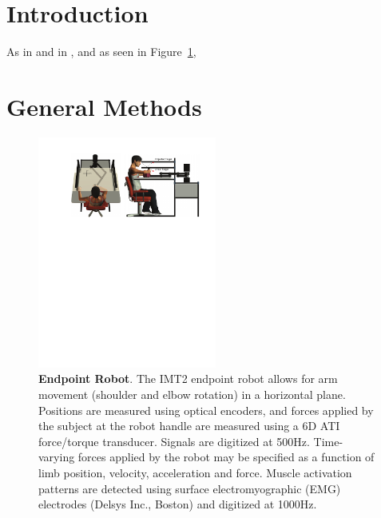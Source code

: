 \documentclass[12pt]{article}
\begin{document}
\begin{multicols}{2}
  
\section*{Introduction}

As in \cite{mattar2005motor} and in \cite{hodgkin1952propagation},
and as seen in Figure~\ref{fig:robot}, \lipsum[1-5]

\section*{General Methods}

\lipsum[1-5]
  
\end{multicols}

\newpage




\newpage
\clearpage
\begin{figure}[H]
	\centering
        \includegraphics[height=3in]{robot_imt.pdf}
        \caption{\textbf{Endpoint Robot}. The IMT2 endpoint robot
          allows for arm movement (shoulder and elbow rotation) in a
          horizontal plane. Positions are measured using optical
          encoders, and forces applied by the subject at the robot
          handle are measured using a 6D ATI force/torque
          transducer. Signals are digitized at 500Hz. Time-varying
          forces applied by the robot may be specified as a function
          of limb position, velocity, acceleration and force. Muscle
          activation patterns are detected using surface
          electromyographic (EMG) electrodes (Delsys Inc., Boston) and
          digitized at 1000Hz.}
 \label{fig:robot}
\end{figure}


\end{document}
